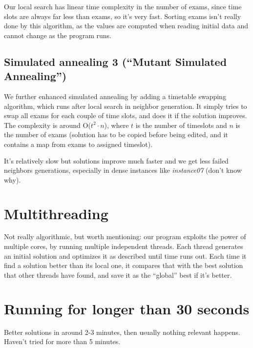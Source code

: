 \documentclass[11pt, a4paper, leqno]{article}
\begin{document}
	Our local search has linear time complexity in the number of exams, since time slots are always far less than exams, so it's very fast. Sorting exams isn't really done by this algorithm, as the values are computed when reading initial data and cannot change as the program runs.
	
	\subsection{Simulated annealing 3 (``Mutant Simulated Annealing\texttrademark'')}
	
	We further enhanced simulated annealing by adding a timetable swapping algorithm, which runs after local search in neighbor generation. It simply tries to swap all exams for each couple of time slots, and does it if the solution improves. The complexity is around O($t^2\cdot n$), where $t$ is the number of timeslots and $n$ is the number of exams (solution has to be copied before being edited, and it contains a map from exams to assigned timeslot).
	
	It's relatively slow but solutions improve much faster and we get less failed neighbors generations, especially in dense instances like \textit{instance07} (don't know why).
	
	\section{Multithreading}
	
	Not really algorithmic, but worth mentioning: our program exploits the power of multiple cores, by running multiple independent threads. Each thread generates an initial solution and optimizes it as described until time runs out. Each time it find a solution better than its local one, it compares that with the best solution that other threads have found, and save it as the ``global'' best if it's better.
	
	\section{Running for longer than 30 seconds}
	
	Better solutions in around 2-3 minutes, then usually nothing relevant happens. Haven't tried for more than 5 minutes.
	
	
\end{document}
